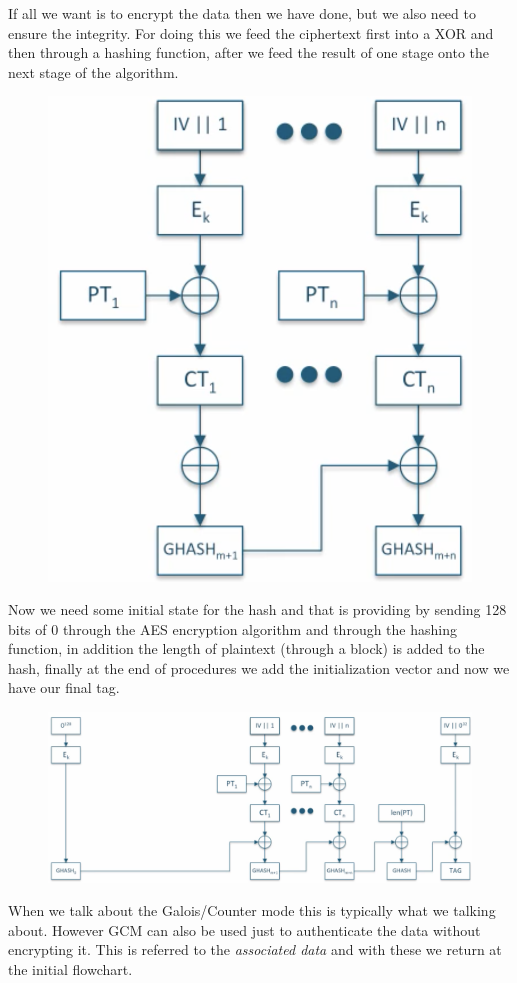 \documentclass[11pt]{article}
\begin{document}
If all we want is to encrypt the data then we have done, but we also need to ensure the integrity. For doing this we feed the ciphertext first into a XOR and then through a hashing function, after we feed the result of one stage onto the next stage of the algorithm.
\begin{figure}[hbt!]
  \centering
  \includegraphics[width=.50\textwidth, height=.35\textheight]{pic4-hw3-1635747}
  \label{fig:Hashing function for AD}
\end{figure}
\newpage
Now we need some initial state for the hash and that is providing by sending 128 bits of 0 through the AES encryption algorithm and through the hashing function, in addition the length of plaintext (through a block) is added to the hash, finally at the end of procedures we add the initialization vector and now we have our final tag.

\begin{figure}[hbt!]
  \centering
  \includegraphics[width=1\textwidth]{pic5-hw3-1635747}
  \label{fig:GCM for AD}
\end{figure}

When we talk about the Galois/Counter mode this is typically what we talking about. However GCM can also be used just to authenticate the data without encrypting it. This is referred to the {\em associated data} and with these we return at the initial flowchart.
\end{document}
